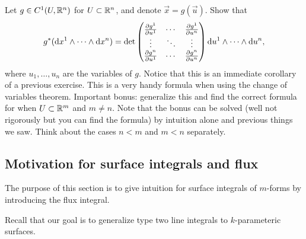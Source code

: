 \documentclass[11pt,a4paper]{article}
\begin{document}
\begin{exercise}
  \label{ex:pullback-for-wedges-of-differentials}
  Let $g \in C^1(U,\mathbb{R}^n)$ for $U \subset \mathbb{R}^n$,
  and denote $\vec x = g(\vec u)$.
  Show that
  \[
    g^*(\dx^1 \wedge \cdots \wedge \dx^n) =
    \det
    \begin{pmatrix}
      \frac{\partial g^1}{\partial u^1} & \cdots & \frac{\partial g^1}{\partial u^n} \\
      \vdots & \ddots & \vdots \\
      \frac{\partial g^n}{\partial u^1} & \cdots & \frac{\partial g^n}{\partial u^n}
    \end{pmatrix}
    \du^1 \wedge \cdots \wedge \du^n,
  \]
  where $u_1,\dots,u_n$ are the variables of $g$.
  Notice that this is an immediate corollary of a previous exercise.
  This is a very handy formula when using the change of variables theorem.
  Important bonus: generalize this and find the correct formula for
  when $U \subset \mathbb{R}^m$ and $m \neq n$.
  Note that the bonus can be solved (well not rigorously but you can
  find the formula) by intuition alone and previous things we saw.
  Think about the cases $n < m$ and $m < n$ separately.
\end{exercise}

\subsection{Motivation for surface integrals and flux}
\begin{remark}
  The purpose of this section is to give intuition for surface integrals
  of $m$-forms by introducing the flux integral.
\end{remark}
\begin{remark}
  Recall that
  our goal is to generalize type two line integrals to $k$-parameteric surfaces.
\end{remark}
\end{document}
